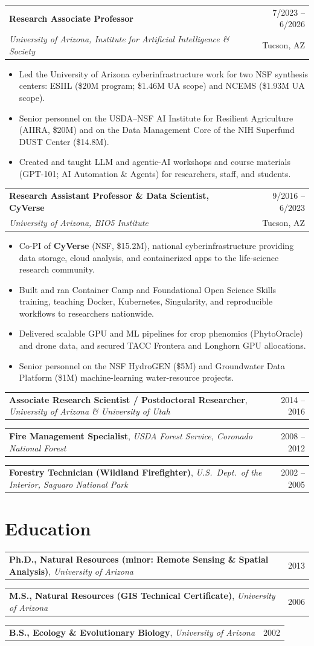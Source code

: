 \documentclass[11pt,letterpaper]{article}
\makeatletter
\newcommand{\job}[4]{%
  \begin{tabularx}{\linewidth}{@{}X r@{}}
    \textbf{#1} & {\small #2}\\
    \textit{#3} & {\small #4}
  \end{tabularx}\par}
\newcommand{\jobline}[3]{%
  \begin{tabularx}{\linewidth}{@{}X r@{}}
    \textbf{#1}, \textit{#2} & {\small #3}
  \end{tabularx}\par\vspace{1pt}}
\makeatother
\begin{document}
\job{Research Associate Professor}{7/2023 -- 6/2026}{University of Arizona, Institute for Artificial Intelligence \& Society}{Tucson, AZ}
\begin{itemize}
  \item Led the University of Arizona cyberinfrastructure work for two NSF synthesis centers: ESIIL (\$20M program; \$1.46M UA scope) and NCEMS (\$1.93M UA scope).
  \item Senior personnel on the USDA--NSF AI Institute for Resilient Agriculture (AIIRA, \$20M) and on the Data Management Core of the NIH Superfund DUST Center (\$14.8M).
  \item Created and taught LLM and agentic-AI workshops and course materials (GPT-101; AI Automation \& Agents) for researchers, staff, and students.
\end{itemize}
\vspace{4pt}

\job{Research Assistant Professor \& Data Scientist, CyVerse}{9/2016 -- 6/2023}{University of Arizona, BIO5 Institute}{Tucson, AZ}
\begin{itemize}
  \item Co-PI of \textbf{CyVerse} (NSF, \$15.2M), national cyberinfrastructure providing data storage, cloud analysis, and containerized apps to the life-science research community.
  \item Built and ran Container Camp and Foundational Open Science Skills training, teaching Docker, Kubernetes, Singularity, and reproducible workflows to researchers nationwide.
  \item Delivered scalable GPU and ML pipelines for crop phenomics (PhytoOracle) and drone data, and secured TACC Frontera and Longhorn GPU allocations.
  \item Senior personnel on the NSF HydroGEN (\$5M) and Groundwater Data Platform (\$1M) machine-learning water-resource projects.
\end{itemize}
\vspace{4pt}

\jobline{Associate Research Scientist / Postdoctoral Researcher}{University of Arizona \& University of Utah}{2014 -- 2016}
\jobline{Fire Management Specialist}{USDA Forest Service, Coronado National Forest}{2008 -- 2012}
\jobline{Forestry Technician (Wildland Firefighter)}{U.S.\ Dept.\ of the Interior, Saguaro National Park}{2002 -- 2005}

\section{Education}
\jobline{Ph.D., Natural Resources (minor: Remote Sensing \& Spatial Analysis)}{University of Arizona}{2013}
\jobline{M.S., Natural Resources (GIS Technical Certificate)}{University of Arizona}{2006}
\jobline{B.S., Ecology \& Evolutionary Biology}{University of Arizona}{2002}
\end{document}
